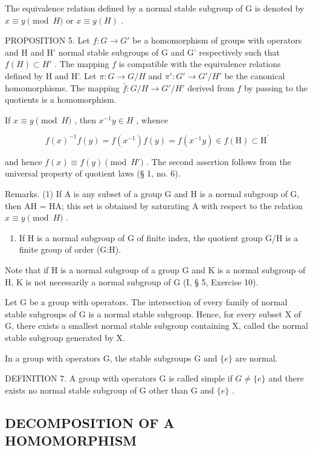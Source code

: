 The equivalence relation defined by a normal stable subgroup of G is denoted by \(x \equiv y \pmod{H}\) or \(x \equiv y(H)\) .

PROPOSITION 5. Let \(f: G \to G'\) be a homomorphism of groups with operators and H and H' normal stable subgroups of G and G' respectively such that \(f(H) \subset H'\) . The mapping \(f\) is compatible with the equivalence relations defined by H and H'. Let \(\pi: G \to G/H\) and \(\pi': G' \to G'/H'\) be the canonical homomorphisms. The mapping \(\bar{f}: G/H \to G'/H'\) derived from \(f\) by passing to the quotients is a homomorphism.

If \(x \equiv y \pmod{H}\) , then \(x^{-1}y \in H\) , whence

\[
f (x) ^ {- 1} f (y) = f \left(x ^ {- 1}\right) f (y) = f \left(x ^ {- 1} y\right) \in f (\mathrm{H}) \subset \mathrm{H} ^ {\prime}
\]

and hence \(f(x) \equiv f(y) \pmod{H'}\) . The second assertion follows from the universal property of quotient laws (§ 1, no. 6).

Remarks. (1) If A is any subset of a group G and H is a normal subgroup of G, then AH = HA; this set is obtained by saturating A with respect to the relation \(x \equiv y \pmod{H}\) .

\begin{enumerate}
\def\labelenumi{(\arabic{enumi})}
\setcounter{enumi}{1}
\tightlist
\item
  If H is a normal subgroup of G of finite index, the quotient group G/H is a finite group of order (G:H).
\end{enumerate}

Note that if H is a normal subgroup of a group G and K is a normal subgroup of H, K is not necessarily a normal subgroup of G (I, § 5, Exercise 10).

Let G be a group with operators. The intersection of every family of normal stable subgroups of G is a normal stable subgroup. Hence, for every subset X of G, there exists a smallest normal stable subgroup containing X, called the normal stable subgroup generated by X.

In a group with operators G, the stable subgroups G and \(\{e\}\) are normal.

DEFINITION 7. A group with operators G is called simple if \(G \neq \{e\}\) and there exists no normal stable subgroup of G other than G and \(\{e\}\) .

\subsection{DECOMPOSITION OF A HOMOMORPHISM}

